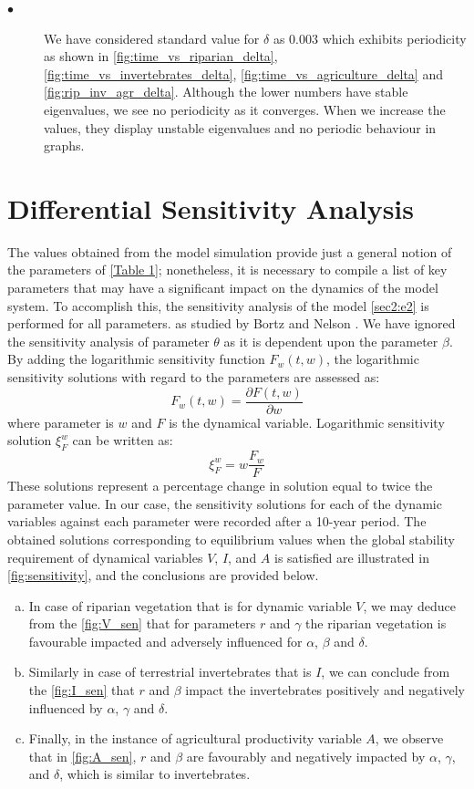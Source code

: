 \documentclass[12pt]{article}
\numberwithin{equation}{section}
\begin{document}
\begin{description}
\item[$\bullet$] We have considered standard value for $\delta$ as $0.003$ which exhibits periodicity as shown in \cref{fig:time_vs_riparian_delta}, \cref{fig:time_vs_invertebrates_delta}, \cref{fig:time_vs_agriculture_delta} and \cref{fig:rip_inv_agr_delta}. Although the lower numbers have stable eigenvalues, we see no periodicity as it converges. When we increase the values, they display unstable eigenvalues and no periodic behaviour in graphs.\\
\end{description}
\section{Differential Sensitivity Analysis}
The values obtained from the model simulation provide just a general notion of the parameters of \autoref{Table 1}; nonetheless, it is necessary to compile a list of key parameters that may have a significant impact on the dynamics of the model system. To accomplish this, the sensitivity analysis of the model \eqref{sec2:e2} is performed for all parameters. as studied by Bortz and Nelson \cite{bortz2004}. We have ignored the sensitivity analysis of parameter $\theta$ as it is dependent upon the parameter $\beta$.\\
By adding the logarithmic sensitivity function $F_w(t,w)$, the logarithmic sensitivity solutions with regard to the parameters are assessed as:
\begin{equation}\label{sec5:e1}
F_w(t,w)=\frac{\partial F(t,w)}{\partial w}
\end{equation}
where parameter is $w$ and $F$ is the dynamical variable. Logarithmic sensitivity solution $\xi^w_F$ can be written as:
\begin{equation}\label{sec5:e2}
\xi^w_F=w\frac{F_w}{F}
\end{equation}
These solutions represent a percentage change in solution equal to twice the parameter value. In our case, the sensitivity solutions for each of the dynamic variables against each parameter were recorded after a 10-year period. The obtained solutions corresponding to equilibrium values when the global stability requirement of dynamical variables $V$, $I$, and $A$ is satisfied are illustrated in \cref{fig:sensitivity}, and the conclusions are provided below.
\begin{enumerate}[a)]
\item In case of riparian vegetation that is for dynamic variable $V$, we may deduce from the \cref{fig:V_sen} that for parameters $r$ and $\gamma$ the riparian vegetation is favourable impacted and adversely influenced for $\alpha$, $\beta$ and $\delta$.
\item Similarly in case of terrestrial invertebrates that is $I$, we can conclude from the \cref{fig:I_sen} that $r$ and $\beta$ impact the invertebrates positively and negatively influenced by $\alpha$, $\gamma$ and $\delta$.
\item Finally, in the instance of agricultural productivity variable $A$, we observe that in \cref{fig:A_sen}, $r$ and $\beta$ are favourably and negatively impacted by $\alpha$, $\gamma$, and $\delta$, which is similar to invertebrates.
\end{enumerate}
\end{document}
